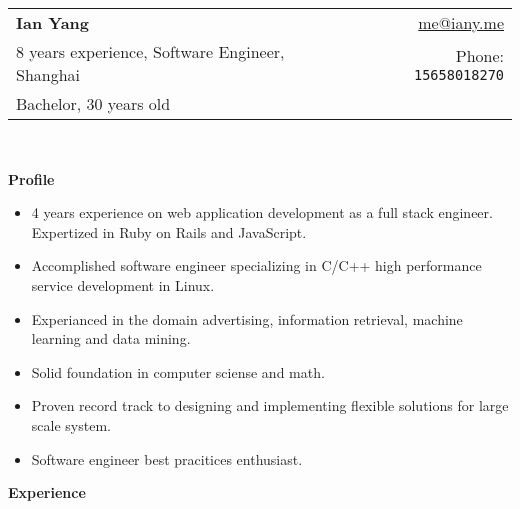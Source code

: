 \documentclass[letterpaper,11pt]{article}
\newcommand{\resheading}[1]{{\large \colorbox{mygrey}{\begin{minipage}{\textwidth}{\textbf{#1 \vphantom{p\^{E}}}}\end{minipage}}}}
\begin{document}
\newcommand{\mywebheader}{
\begin{tabular*}{7in}{l@{\extracolsep{\fill}}r}
	\textbf{\LARGE Ian Yang} & \href{mailto:me@iany.me}{me@iany.me} \\
    {\small 8 years experience, Software Engineer, Shanghai} & {\small Phone: \texttt{15658018270}} \\
    {\footnotesize Bachelor, 30 years old} & \\
	\end{tabular*}
\\
\vspace{0.1in}}

\mywebheader

\resheading{Profile}

\begin{itemize}
\item 4 years experience on web application development as a full stack
  engineer. Expertized in Ruby on Rails and JavaScript.
\item Accomplished software engineer specializing in C/C++ high
  performance service development in Linux.
\item Experianced in the domain advertising, information retrieval, machine learning and data
  mining.
\item Solid foundation in computer sciense and math.
\item Proven record track to designing and implementing flexible solutions for
  large scale system.
\item Software engineer best pracitices enthusiast.
\end{itemize}

\resheading{Experience}
\end{document}
